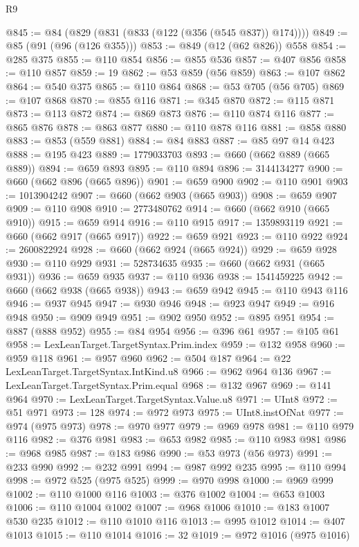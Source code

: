 \begin{lexlean}{R9}
\begin{coremodule}
@845 := @84 (@829 (@831 (@833 (@122 (@356 (@545 @837)) @174))))
@849 := @85 (@91 (@96 (@126 @355)))
@853 := @849 (@12 (@62 @826)) @558
@854 := @285 @375
@855 := @110 @854
@856 := @855 @536
@857 := @407 @856
@858 := @110 @857
@859 := 19
@862 := @53 @859 (@56 @859)
@863 := @107 @862
@864 := @540 @375
@865 := @110 @864
@868 := @53 @705 (@56 @705)
@869 := @107 @868
@870 := @855 @116
@871 := @345 @870
@872 := @115 @871
@873 := @113 @872
@874 := @869 @873
@876 := @110 @874 @116
@877 := @865 @876
@878 := @863 @877
@880 := @110 @878 @116
@881 := @858 @880
@883 := @853 (@559 @881)
@884 := @84 @883
@887 := @85 @97 @14 @423
@888 := @195 @423
@889 := 1779033703
@893 := @660 (@662 @889 (@665 @889))
@894 := @659 @893
@895 := @110 @894
@896 := 3144134277
@900 := @660 (@662 @896 (@665 @896))
@901 := @659 @900
@902 := @110 @901
@903 := 1013904242
@907 := @660 (@662 @903 (@665 @903))
@908 := @659 @907
@909 := @110 @908
@910 := 2773480762
@914 := @660 (@662 @910 (@665 @910))
@915 := @659 @914
@916 := @110 @915
@917 := 1359893119
@921 := @660 (@662 @917 (@665 @917))
@922 := @659 @921
@923 := @110 @922
@924 := 2600822924
@928 := @660 (@662 @924 (@665 @924))
@929 := @659 @928
@930 := @110 @929
@931 := 528734635
@935 := @660 (@662 @931 (@665 @931))
@936 := @659 @935
@937 := @110 @936
@938 := 1541459225
@942 := @660 (@662 @938 (@665 @938))
@943 := @659 @942
@945 := @110 @943 @116
@946 := @937 @945
@947 := @930 @946
@948 := @923 @947
@949 := @916 @948
@950 := @909 @949
@951 := @902 @950
@952 := @895 @951
@954 := @887 (@888 @952)
@955 := @84 @954
@956 := @396 @61
@957 := @105 @61
@958 := LexLeanTarget.TargetSyntax.Prim.index
@959 := @132 @958
@960 := @959 @118
@961 := @957 @960
@962 := @504 @187
@964 := @22 LexLeanTarget.TargetSyntax.IntKind.u8
@966 := @962 @964 @136
@967 := LexLeanTarget.TargetSyntax.Prim.equal
@968 := @132 @967
@969 := @141 @964
@970 := LexLeanTarget.TargetSyntax.Value.u8
@971 := UInt8
@972 := @51 @971
@973 := 128
@974 := @972 @973
@975 := UInt8.instOfNat
@977 := @974 (@975 @973)
@978 := @970 @977
@979 := @969 @978
@981 := @110 @979 @116
@982 := @376 @981
@983 := @653 @982
@985 := @110 @983 @981
@986 := @968 @985
@987 := @183 @986
@990 := @53 @973 (@56 @973)
@991 := @233 @990
@992 := @232 @991
@994 := @987 @992 @235
@995 := @110 @994
@998 := @972 @525 (@975 @525)
@999 := @970 @998
@1000 := @969 @999
@1002 := @110 @1000 @116
@1003 := @376 @1002
@1004 := @653 @1003
@1006 := @110 @1004 @1002
@1007 := @968 @1006
@1010 := @183 @1007 @530 @235
@1012 := @110 @1010 @116
@1013 := @995 @1012
@1014 := @407 @1013
@1015 := @110 @1014
@1016 := 32
@1019 := @972 @1016 (@975 @1016)

\end{coremodule}
\end{lexlean}
